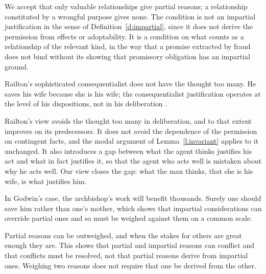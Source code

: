 \documentclass{situationist-preprint}
\begin{document}
\begin{reply}
We accept that only valuable relationships give partial reasons; a relationship constituted by a wrongful purpose gives none. The condition is not an impartial justification in the sense of Definition~\ref{d:impartial}, since it does not derive the permission from effects or adoptability. It is a condition on what counts as a relationship of the relevant kind, in the way that a promise extracted by fraud does not bind without its showing that promissory obligation has an impartial ground.
\end{reply}

\begin{objection}\label{o:railton}
Railton's sophisticated consequentialist does not have the thought too many. He saves his wife because she is his wife; the consequentialist justification operates at the level of his dispositions, not in his deliberation \citep{Railton1984}.
\end{objection}

\begin{reply}
Railton's view avoids the thought too many in deliberation, and to that extent improves on its predecessors. It does not avoid the dependence of the permission on contingent facts, and the modal argument of Lemma~\ref{l:invariant} applies to it unchanged. It also introduces a gap between what the agent thinks justifies his act and what in fact justifies it, so that the agent who acts well is mistaken about why he acts well. Our view closes the gap: what the man thinks, that she is his wife, is what justifies him.
\end{reply}

\begin{objection}\label{o:godwin}
In Godwin's case, the archbishop's work will benefit thousands. Surely one should save him rather than one's mother, which shows that impartial considerations can override partial ones and so must be weighed against them on a common scale.
\end{objection}

\begin{reply}
Partial reasons can be outweighed, and when the stakes for others are great enough they are. This shows that partial and impartial reasons can conflict and that conflicts must be resolved, not that partial reasons derive from impartial ones. Weighing two reasons does not require that one be derived from the other.
\end{reply}
\end{document}

